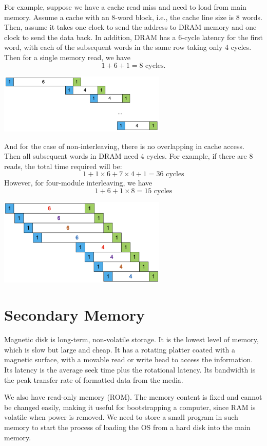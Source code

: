 For example, suppose we have a cache read miss and need to load from main memory. Assume a cache with an 8-word block, i.e., the cache line size is 8 words. Then, assume it takes one clock to send the address to DRAM memory and one clock to send the data back. In addition, DRAM has a 6-cycle latency for the first word, with each of the subsequent words in the same row taking only 4 cycles. Then for a single memory read, we have 
\[
  1 + 6 + 1 = 8 \text{ cycles}.
\]
\begin{center}
  \includegraphics[width=0.6\textwidth]{Figure/overleaving_1.png}
\end{center}
And for the case of non-interleaving, there is no overlapping in cache access. Then all subsequent words in DRAM need 4 cycles. For example, if there are 8 reads, the total time required will be:
\[
  1 + 1 \times 6 + 7 \times 4 + 1 = 36 \text{ cycles}
\]
However, for four-module interleaving, we have 
\[
  1 + 6 + 1 \times 8 = 15 \text{ cycles}
\]
\begin{center}
  \includegraphics[width=0.6\textwidth]{Figure/overleaving_2.png}
\end{center}

\section{Secondary Memory}
Magnetic disk is long-term, non-volatile storage. It is the lowest level of memory, which is slow but large and cheap. It has a rotating platter coated with a magnetic surface, with a movable read or write head to access the information. Its latency is the average seek time plus the rotational latency. Its bandwidth is the peak transfer rate of formatted data from the media.

We also have read-only memory (ROM). The memory content is fixed and cannot be changed easily, making it useful for bootstrapping a computer, since RAM is volatile when power is removed. We need to store a small program in such memory to start the process of loading the OS from a hard disk into the main memory.

